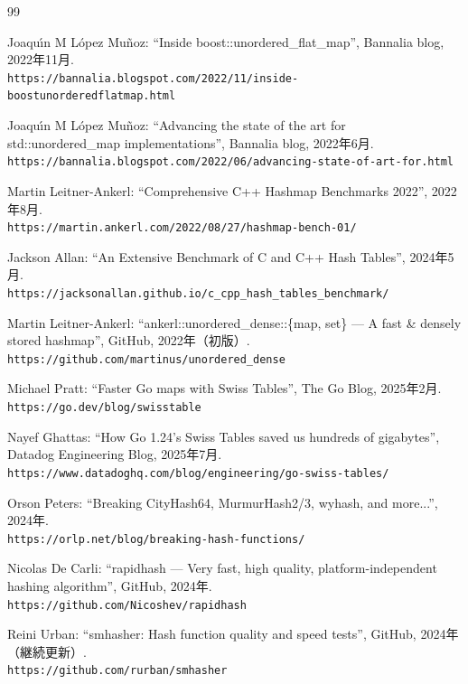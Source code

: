 \begin{thebibliography}{99}

Joaqu\'{\i}n M L\'{o}pez Mu\~{n}oz:
``Inside boost::unordered\_flat\_map'', Bannalia blog, 2022年11月.\\
{\small\tt https://bannalia.blogspot.com/2022/11/inside-boostunorderedflatmap.html}

Joaqu\'{\i}n M L\'{o}pez Mu\~{n}oz:
``Advancing the state of the art for std::unordered\_map implementations'', Bannalia blog, 2022年6月.\\
{\small\tt https://bannalia.blogspot.com/2022/06/advancing-state-of-art-for.html}

Martin Leitner-Ankerl:
``Comprehensive C++ Hashmap Benchmarks 2022'', 2022年8月.\\
{\small\tt https://martin.ankerl.com/2022/08/27/hashmap-bench-01/}

Jackson Allan:
``An Extensive Benchmark of C and C++ Hash Tables'', 2024年5月.\\
{\small\tt https://jacksonallan.github.io/c\_cpp\_hash\_tables\_benchmark/}

Martin Leitner-Ankerl:
``ankerl::unordered\_dense::\{map, set\} --- A fast \& densely stored hashmap'', GitHub, 2022年（初版）.\\
{\small\tt https://github.com/martinus/unordered\_dense}

Michael Pratt:
``Faster Go maps with Swiss Tables'', The Go Blog, 2025年2月.\\
{\small\tt https://go.dev/blog/swisstable}

Nayef Ghattas:
``How Go 1.24's Swiss Tables saved us hundreds of gigabytes'', Datadog Engineering Blog, 2025年7月.\\
{\small\tt https://www.datadoghq.com/blog/engineering/go-swiss-tables/}

Orson Peters:
``Breaking CityHash64, MurmurHash2/3, wyhash, and more...'', 2024年.\\
{\small\tt https://orlp.net/blog/breaking-hash-functions/}

Nicolas De Carli:
``rapidhash --- Very fast, high quality, platform-independent hashing algorithm'', GitHub, 2024年.\\
{\small\tt https://github.com/Nicoshev/rapidhash}

Reini Urban:
``smhasher: Hash function quality and speed tests'', GitHub, 2024年（継続更新）.\\
{\small\tt https://github.com/rurban/smhasher}


\end{thebibliography}
